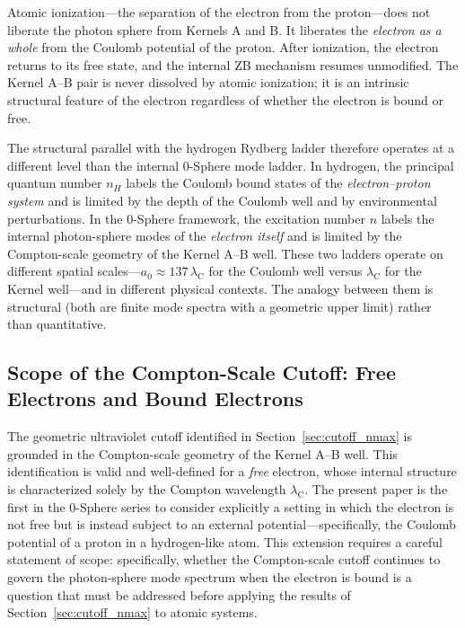 \documentclass[%
 reprint, amsmath,amssymb, aps, prb, ]{revtex4-2}
\numberwithin{equation}{section}
\newcommand{\lambdaC}{\lambda_{\mathrm{C}}}
\begin{document}
Atomic ionization---the separation of the electron from the proton---does not liberate the photon sphere from Kernels A and B. It liberates the \emph{electron as a whole} from the Coulomb potential of the proton. After ionization, the electron returns to its free state, and the internal ZB mechanism resumes unmodified. The Kernel A--B pair is never dissolved by atomic ionization; it is an intrinsic structural feature of the electron regardless of whether the electron is bound or free.

The structural parallel with the hydrogen Rydberg ladder therefore operates at a different level than the internal 0-Sphere mode ladder. In hydrogen, the principal quantum number $n_H$ labels the Coulomb bound states of the \emph{electron--proton system} and is limited by the depth of the Coulomb well and by environmental perturbations. In the 0-Sphere framework, the excitation number $n$ labels the internal photon-sphere modes of the \emph{electron itself} and is limited by the Compton-scale geometry of the Kernel A--B well. These two ladders operate on different spatial scales---$a_0 \approx 137\,\lambdaC$ for the Coulomb well versus $\lambdaC$ for the Kernel well---and in different physical contexts. The analogy between them is structural (both are finite mode spectra with a geometric upper limit) rather than quantitative.

\subsection{Scope of the Compton-Scale Cutoff: Free Electrons and Bound Electrons}
\label{sec:cutoff_scope}

The geometric ultraviolet cutoff identified in Section~\ref{sec:cutoff_nmax} is grounded in the Compton-scale geometry of the Kernel A--B well. This identification is valid and well-defined for a \emph{free} electron, whose internal structure is characterized solely by the Compton wavelength $\lambdaC$. The present paper is the first in the 0-Sphere series to consider explicitly a setting in which the electron is not free but is instead subject to an external potential---specifically, the Coulomb potential of a proton in a hydrogen-like atom. This extension requires a careful statement of scope: specifically, whether the Compton-scale cutoff continues to govern the photon-sphere mode spectrum when the electron is bound is a question that must be addressed before applying the results of Section~\ref{sec:cutoff_nmax} to atomic systems.
\end{document}
